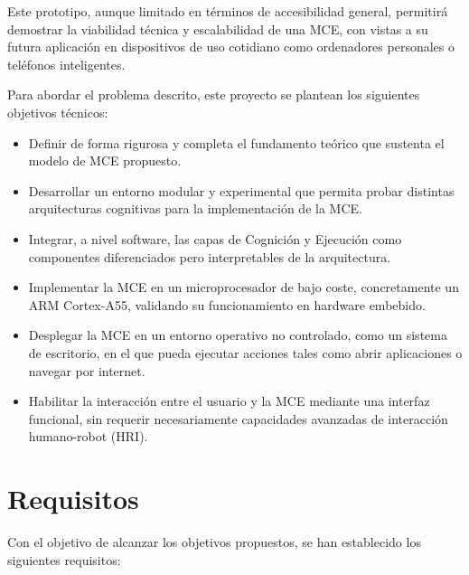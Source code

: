Este prototipo, aunque limitado en términos de accesibilidad general, 
permitirá demostrar la viabilidad técnica y escalabilidad de una MCE, 
con vistas a su futura aplicación en dispositivos de uso cotidiano como 
ordenadores personales o teléfonos inteligentes.

Para abordar el problema descrito, este proyecto se plantean los siguientes
objetivos técnicos:


\begin{itemize}

	\item Definir de forma rigurosa y completa el fundamento teórico que sustenta el
    modelo de MCE propuesto.

    \item Desarrollar un entorno modular y experimental que permita probar distintas
    arquitecturas cognitivas para la implementación de la MCE.

    \item Integrar, a nivel software, las capas de Cognición y Ejecución como componentes
    diferenciados pero interpretables de la arquitectura.

    \item Implementar la MCE en un microprocesador de bajo coste, concretamente un ARM
    Cortex-A55, validando su funcionamiento en hardware embebido.

    \item Desplegar la MCE en un entorno operativo no controlado, como un sistema de
    escritorio, en el que pueda ejecutar acciones tales como abrir aplicaciones o
    navegar por internet.

    \item Habilitar la interacción entre el usuario y la MCE mediante una interfaz
    funcional, sin requerir necesariamente capacidades avanzadas de interacción
    humano-robot (HRI).

\end{itemize}

\section{Requisitos}

Con el objetivo de alcanzar los objetivos propuestos, se han establecido los
siguientes requisitos:

